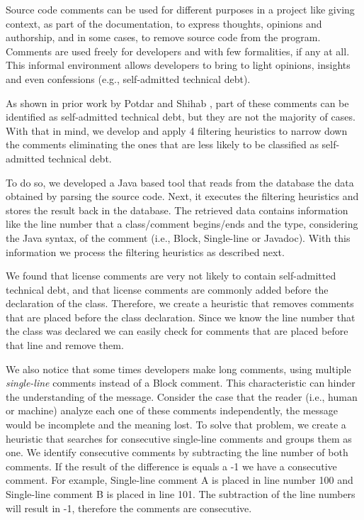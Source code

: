 Source code comments can be used for different purposes in a project like giving context, as part of the documentation, to express thoughts, opinions and authorship, and in some cases, to remove source code from the program. Comments are used freely for developers and with few formalities, if any at all. This informal environment allows developers to bring to light opinions, insights and even confessions (e.g., self-admitted technical debt). 

As shown in prior work by Potdar and Shihab \cite{Potdar2014ICSME}, part of these comments can be identified as self-admitted technical debt, but they are not the majority of cases. With that in mind, we develop and apply 4 filtering heuristics to narrow down the comments eliminating the ones that are less likely to be classified as self-admitted technical debt.

To do so, we developed a Java based tool that reads from the database the data obtained by parsing the source code. Next, it executes the filtering heuristics and stores the result back in the database. The retrieved data contains information like the line number that a class/comment begins/ends and the type, considering the Java syntax, of the comment (i.e., Block, Single-line or Javadoc). With this information we process the filtering heuristics as described next.

We found that license comments are very not likely to contain self-admitted technical debt, and that license comments are commonly added before the declaration of the class. Therefore, we create a heuristic that removes comments that are placed before the class declaration. Since we know the line number that the class was declared we can easily check for comments that are placed before that line and remove them.

We also notice that some times developers make long comments, using multiple \emph{single-line} comments instead of a Block comment. This characteristic can hinder the understanding of the message. Consider the case that the reader (i.e., human or machine) analyze each one of these comments independently, the message would be incomplete and the meaning lost. To solve that problem, we create a heuristic that searches for consecutive single-line comments and groups them as one. We identify consecutive comments by subtracting the line number of both comments. If the result of the difference is equals a -1 we have a consecutive comment. For example, Single-line comment A is placed in line number 100 and Single-line comment B is placed in line 101. The subtraction of the line numbers will result in -1, therefore the comments are consecutive.
 
